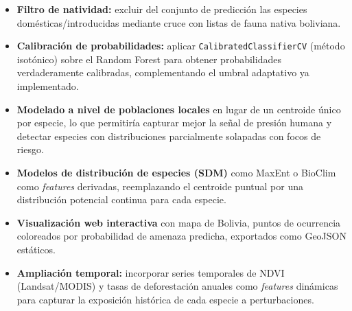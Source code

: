 \documentclass[12pt,a4paper]{article}
\begin{document}
\begin{itemize}
  \item \textbf{Filtro de natividad:} excluir del conjunto de predicción las especies
        domésticas/introducidas mediante cruce con listas de fauna nativa boliviana.
  \item \textbf{Calibración de probabilidades:} aplicar \texttt{CalibratedClassifierCV}
        (método isotónico) sobre el Random Forest para obtener probabilidades verdaderamente
        calibradas, complementando el umbral adaptativo ya implementado.
  \item \textbf{Modelado a nivel de poblaciones locales} en lugar de un centroide único
        por especie, lo que permitiría capturar mejor la señal de presión humana y
        detectar especies con distribuciones parcialmente solapadas con focos de riesgo.
  \item \textbf{Modelos de distribución de especies (SDM)} como MaxEnt o BioClim como
        \textit{features} derivadas, reemplazando el centroide puntual por una
        distribución potencial continua para cada especie.
  \item \textbf{Visualización web interactiva} con mapa de Bolivia, puntos de ocurrencia
        coloreados por probabilidad de amenaza predicha, exportados como GeoJSON estáticos.
  \item \textbf{Ampliación temporal:} incorporar series temporales de NDVI (Landsat/MODIS)
        y tasas de deforestación anuales como \textit{features} dinámicas para capturar
        la exposición histórica de cada especie a perturbaciones.
\end{itemize}
\end{document}
